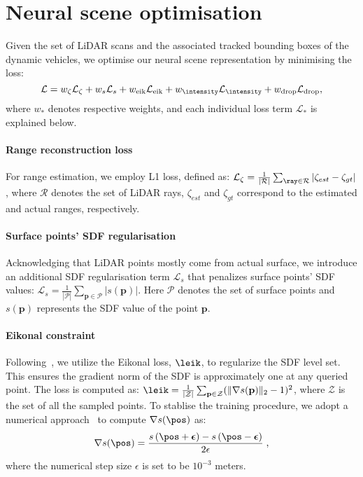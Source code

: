 \section{Neural scene optimisation} \label{sec:optmisation}
Given the set of LiDAR scans and the associated tracked bounding boxes of the dynamic vehicles, we optimise our neural scene representation by minimising the loss:
\begin{equation}
    \mathcal{L} = w_{\zeta} \mathcal{L}_{\zeta} +  w_{s} \mathcal{L}_{s} + w_{\text{eik}} \mathcal{L}_{\text{eik}} + w_{\intensity} \mathcal{L}_{\intensity} + w_{\text{drop}} \mathcal{L}_{\text{drop}},
    \label{loss}
\end{equation}
where $w_{*}$ denotes respective weights, and each individual loss term $\mathcal{L}_*$ is explained below.


\paragraph{Range reconstruction loss}
For range estimation, we employ L1 loss, defined as: $\mathcal{L}_{\zeta} = \frac{1}{|\mathcal{R}|}\sum_{\ray \in \mathcal{R}}|\zeta_{est} -\zeta_{gt}|$, where $\mathcal{R}$ denotes the set of LiDAR rays, $\zeta_{est}$ and $\zeta_{gt}$ correspond to the estimated and actual ranges, respectively. 


\paragraph{Surface points' SDF regularisation} \label{sec:surfacesdf}
Acknowledging that LiDAR points mostly come from actual surface, we introduce an additional SDF regularisation term $\mathcal{L}_{s}$ that penalizes surface points' SDF values: $\mathcal{L}_{s} = \frac{1}{|\mathcal{P}|}\sum_{\mathbf{p} \in \mathcal{P}}|s(\mathbf{p})|$. Here $\mathcal{P}$ denotes the set of surface points and $s({\mathbf{p}})$ represents the SDF value of the point $\mathbf{p}$.


\paragraph{Eikonal constraint}
Following~\cite{icml2020_2086}, we utilize the Eikonal loss, $\leik$, to regularize the SDF level set. This ensures the gradient norm of the SDF is approximately one at any queried point. The loss is computed as: $\leik = \frac{1}{|\mathcal{Z}|} \sum_{\mathbf{p} \in \mathcal{Z}}( \| \nabla s(\mathbf{p}) \|_2 - 1)^2$, where $\mathcal{Z}$ is the set of all the sampled points. To stablise the training procedure, we adopt a numerical approach~\cite{li2023neuralangelo} to compute $\nabla s(\pos)$ as: 
\begin{equation}
    \nabla s(\pos) = \frac{s \left( \pos + \boldsymbol{\epsilon} \right) - s \left(\pos - \boldsymbol{\epsilon} \right)}{2 \epsilon} \;,
    \label{eqn:central_diff_normal}
\end{equation}
where the numerical step size $\epsilon$ is set to be $10^{-3}$ meters.


